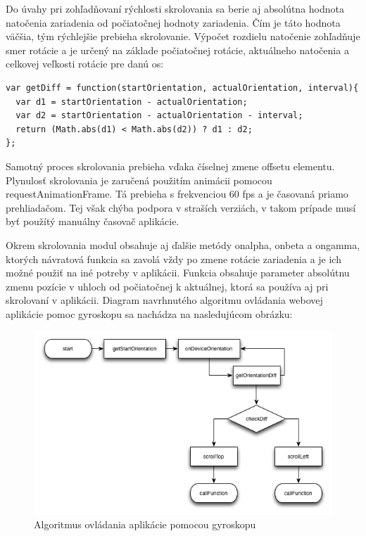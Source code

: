 Do úvahy pri zohľadňovaní rýchlosti skrolovania sa berie aj absolútna hodnota natočenia zariadenia od počiatočnej hodnoty zariadenia. Čím je táto hodnota väčšia, tým rýchlejšie prebieha skrolovanie. Výpočet rozdielu natočenie zohľadňuje smer rotácie a je určený na základe počiatočnej rotácie, aktuálneho natočenia a celkovej veľkosti rotácie pre danú os:

\begin{lstlisting}
var getDiff = function(startOrientation, actualOrientation, interval){
  var d1 = startOrientation - actualOrientation;
  var d2 = startOrientation - actualOrientation - interval;
  return (Math.abs(d1) < Math.abs(d2)) ? d1 : d2;
};
\end{lstlisting}

Samotný proces skrolovania prebieha vďaka číselnej zmene offsetu elementu. Plynulosť skrolovania je zaručená použitím animácii pomocou requestAnimationFrame. Tá prebieha s frekvenciou 60 fps a je časovaná priamo prehliadačom. Tej však chýba podpora v straších verziách, v takom prípade musí byť použítý manuálny časovač aplikácie.

Okrem skrolovania modul obsahuje aj ďalšie metódy onalpha, onbeta a ongamma, ktorých návratová funkcia sa zavolá vždy po zmene rotácie zariadenia a je ich možné použiť na iné potreby v aplikácii. Funkcia obsahuje parameter absolútnu zmenu pozície v uhloch od počiatočnej k aktuálnej, ktorá sa používa aj pri skrolovaní v aplikácii. Diagram navrhnutého algoritmu ovládania webovej aplikácie pomoc gyroskopu sa nachádza na nasledujúcom obrázku:

\begin{figure}[H]
  \centering
  \includegraphics[width=1.0\textwidth]{diagram/scroll.png}
  \caption[Algoritmus ovládania aplikácie pomocou gyroskopu]{
    Algoritmus ovládania aplikácie pomocou gyroskopu}
  \label{fig: diascroll}
\end{figure}

